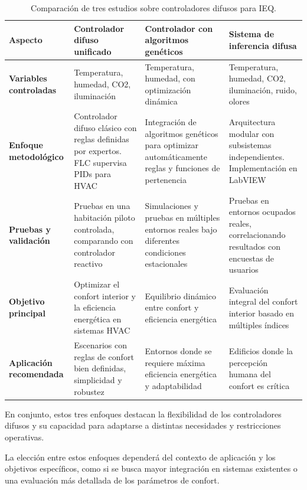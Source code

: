 \begin{table}[H]
	\centering
	\renewcommand{\arraystretch}{1.5}
	\begin{tabular}{|p{2.5cm}|p{4cm}|p{4cm}|p{4cm}|}
		\hline
		\rowcolor{lightgray}
		\textbf{Aspecto} & \textbf{Controlador difuso unificado} & \textbf{Controlador con algoritmos genéticos} & \textbf{Sistema de inferencia difusa} \\ \hline
		
		\textbf{Variables controladas} & 
		Temperatura, humedad, CO2, iluminación & 
		Temperatura, humedad, con optimización dinámica & 
		Temperatura, humedad, CO2, iluminación, ruido, olores \\ \hline
		
		\textbf{Enfoque metodológico} & 
		Controlador difuso clásico con reglas definidas por expertos. FLC supervisa PIDs para HVAC & 
		Integración de algoritmos genéticos para optimizar automáticamente reglas y funciones de pertenencia & 
		Arquitectura modular con subsistemas independientes. Implementación en LabVIEW \\ \hline
		
		\textbf{Pruebas y validación} & 
		Pruebas en una habitación piloto controlada, comparando con controlador reactivo & 
		Simulaciones y pruebas en múltiples entornos reales bajo diferentes condiciones estacionales & 
		Pruebas en entornos ocupados reales, correlacionando resultados con encuestas de usuarios \\ \hline
		
		\textbf{Objetivo principal} & 
		Optimizar el confort interior y la eficiencia energética en sistemas HVAC & 
		Equilibrio dinámico entre confort y eficiencia energética & 
		Evaluación integral del confort interior basado en múltiples índices \\ \hline
		
		\textbf{Aplicación recomendada} & 
		Escenarios con reglas de confort bien definidas, simplicidad y robustez & 
		Entornos donde se requiere máxima eficiencia energética y adaptabilidad & 
		Edificios donde la percepción humana del confort es crítica \\ \hline
	\end{tabular}
	\caption{Comparación de tres estudios sobre controladores difusos para IEQ.}
	\label{tab:comparacion}
\end{table}

En conjunto, estos tres enfoques destacan la flexibilidad de los controladores difusos y su capacidad para adaptarse a distintas necesidades y restricciones operativas.

La elección entre estos enfoques dependerá del contexto de aplicación y los objetivos específicos, como si se busca mayor integración en sistemas existentes o una evaluación más detallada de los parámetros de confort.